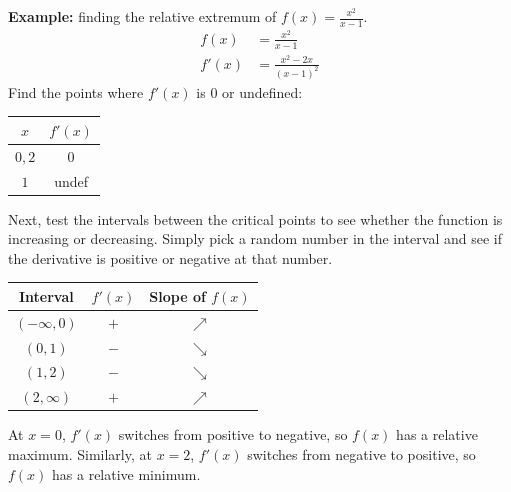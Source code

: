 \documentclass[12pt]{article}
\begin{document}
                \noindent \textbf{Example:} finding the relative extremum of $f(x) = \frac{x^2}{x-1}$.
                \begin{align*}
                    f(x) &= \frac{x^2}{x-1} \\[6pt]
                    f'(x) &= \frac{x^2-2x}{(x-1)^2}
                \end{align*}
                Find the points where $f'(x)$ is $0$ or undefined:
                \begin{center}
                    \begin{tabular}{|c|c|}
                        \hline
                        $x$ & $f'(x)$ \\
                        \hline \hline
                        $0, 2$ & $0$ \\
                        \hline
                        $1$ & undef \\
                        \hline
                    \end{tabular}
                \end{center}

                Next, test the intervals between the critical points to see whether the function is increasing or decreasing. Simply pick a random number in the interval and see if the derivative is positive or negative at that number.
                \begin{center}
                    \begin{tabular}{|c|c|c|}
                        \hline
                        Interval & $f'(x)$ & Slope of $f(x)$ \\
                        \hline \hline
                        $(-\infty, 0)$ & $+$ & $\nearrow$ \\
                        \hline
                        $(0, 1)$ & $-$ & $\searrow$ \\
                        \hline
                        $(1, 2)$ & $-$ & $\searrow$ \\
                        \hline
                        $(2, \infty)$ & $+$ & $\nearrow$ \\
                        \hline
                    \end{tabular}
                \end{center}

                At $x=0$, $f'(x)$ switches from positive to negative, so $f(x)$ has a relative maximum. Similarly, at $x=2$, $f'(x)$ switches from negative to positive, so $f(x)$ has a relative minimum.
\end{document}
